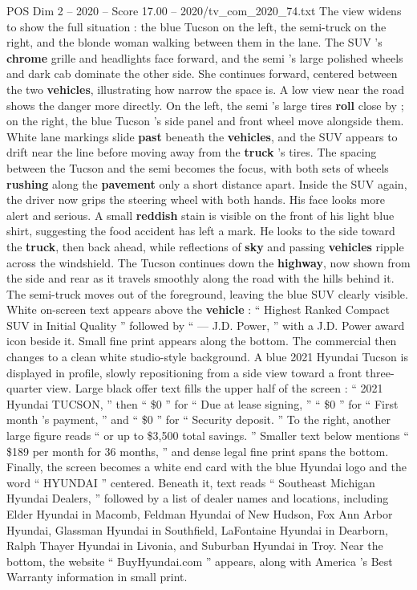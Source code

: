 \begin{textsample}{POS Dim 2 – 2020 – Score 17.00 – 2020/tv\_com\_2020\_74.txt}
The view widens to show the full situation : the blue Tucson on the left, the semi-truck on the right, and the blonde woman walking between them in the lane.
The SUV ’s \textbf{chrome} grille and headlights face forward, and the semi ’s large polished wheels and dark cab dominate the other side.
She continues forward, centered between the two \textbf{vehicles}, illustrating how narrow the space is.
A low view near the road shows the danger more directly.
On the left, the semi ’s large tires \textbf{roll} close by ; on the right, the blue Tucson ’s side panel and front wheel move alongside them.
White lane markings slide \textbf{past} beneath the \textbf{vehicles}, and the SUV appears to drift near the line before moving away from the \textbf{truck} ’s tires.
The spacing between the Tucson and the semi becomes the focus, with both sets of wheels \textbf{rushing} along the \textbf{pavement} only a short distance apart.
Inside the SUV again, the driver now grips the steering wheel with both hands.
His face looks more alert and serious.
A small \textbf{reddish} stain is visible on the front of his light blue shirt, suggesting the food accident has left a mark.
He looks to the side toward the \textbf{truck}, then back ahead, while reflections of \textbf{sky} and passing \textbf{vehicles} ripple across the windshield.
The Tucson continues down the \textbf{highway}, now shown from the side and rear as it travels smoothly along the road with the hills behind it.
The semi-truck moves out of the foreground, leaving the blue SUV clearly visible.
White on-screen text appears above the \textbf{vehicle} : “ Highest Ranked Compact SUV in Initial Quality ” followed by “ — J.D.
Power, ” with a J.D.
Power award icon beside it.
Small fine print appears along the bottom.
The commercial then changes to a clean white studio-style background.
A blue 2021 Hyundai Tucson is displayed in profile, slowly repositioning from a side view toward a front three-quarter view.
Large black offer text fills the upper half of the screen : “ 2021 Hyundai TUCSON, ” then “ \$0 ” for “ Due at lease signing, ” “ \$0 ” for “ First month ’s payment, ” and “ \$0 ” for “ Security deposit. ” To the right, another large figure reads “ or up to \$3,500 total savings. ” Smaller text below mentions “ \$189 per month for 36 months, ” and dense legal fine print spans the bottom.
Finally, the screen becomes a white end card with the blue Hyundai logo and the word “ HYUNDAI ” centered.
Beneath it, text reads “ Southeast Michigan Hyundai Dealers, ” followed by a list of dealer names and locations, including Elder Hyundai in Macomb, Feldman Hyundai of New Hudson, Fox Ann Arbor Hyundai, Glassman Hyundai in Southfield, LaFontaine Hyundai in Dearborn, Ralph Thayer Hyundai in Livonia, and Suburban Hyundai in Troy.
Near the bottom, the website “ BuyHyundai.com ” appears, along with America ’s Best Warranty information in small print.

\end{textsample}
